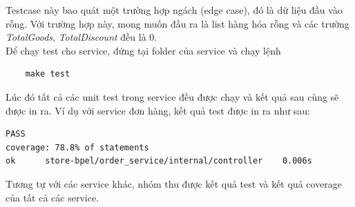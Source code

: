 Testcase này bao quát một trường hợp ngách (edge case), đó là dữ liệu đầu vào rỗng. Với trường hợp này, mong muốn đầu ra là list hàng hóa rỗng và các trường \emph{TotalGoods}, \emph{TotalDiscount} đều là 0.\\

Để chạy test cho service, đứng tại folder của service và chạy lệnh
\begin{lstlisting}
    make test
\end{lstlisting}

Lúc đó tất cả các unit test trong service đều được chạy và kết quả sau cùng sẽ được in ra. Ví dụ với service đơn hàng, kết quả test được in ra như sau:
\begin{lstlisting}
PASS
coverage: 78.8% of statements
ok      store-bpel/order_service/internal/controller    0.006s
\end{lstlisting}

Tương tự với các service khác, nhóm thu được kết quả test và kết quả coverage của tất cả các service.

